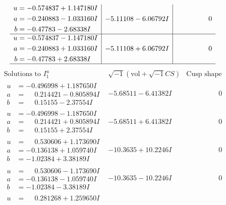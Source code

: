 \documentclass[1p]{elsarticle_modified}
\theoremstyle{definition}
\newcommand{\I}{\sqrt{-1}}
\begin{document}
$$\begin{array}{c|c|c}
\begin{aligned}
u &= -0.574837 + 1.147180 I \\
a &= -0.240883 - 1.033160 I \\
b &= -0.47783 - 2.68338 I\end{aligned}
 & -5.11108 - 6.06792 I & \phantom{-0.000000 } 0 \\ \hline\begin{aligned}
u &= -0.574837 - 1.147180 I \\
a &= -0.240883 + 1.033160 I \\
b &= -0.47783 + 2.68338 I\end{aligned}
 & -5.11108 + 6.06792 I & \phantom{-0.000000 } 0\\
 \hline 
 \end{array}$$\newpage$$\begin{array}{c|c|c}  
\text{Solutions to }I^u_{1}& \I (\text{vol} + \sqrt{-1}CS) & \text{Cusp shape}\\
 \hline 
\begin{aligned}
u &= -0.496998 + 1.187650 I \\
a &= \phantom{-}0.214421 - 0.805894 I \\
b &= \phantom{-}0.15155 - 2.37554 I\end{aligned}
 & -5.68511 - 6.41382 I & \phantom{-0.000000 } 0 \\ \hline\begin{aligned}
u &= -0.496998 - 1.187650 I \\
a &= \phantom{-}0.214421 + 0.805894 I \\
b &= \phantom{-}0.15155 + 2.37554 I\end{aligned}
 & -5.68511 + 6.41382 I & \phantom{-0.000000 } 0 \\ \hline\begin{aligned}
u &= \phantom{-}0.530606 + 1.173690 I \\
a &= -0.136138 + 1.059740 I \\
b &= -1.02384 + 3.38189 I\end{aligned}
 & -10.3635 + 10.2246 I & \phantom{-0.000000 } 0 \\ \hline\begin{aligned}
u &= \phantom{-}0.530606 - 1.173690 I \\
a &= -0.136138 - 1.059740 I \\
b &= -1.02384 - 3.38189 I\end{aligned}
 & -10.3635 - 10.2246 I & \phantom{-0.000000 } 0 \\ \hline\begin{aligned}
u &= \phantom{-}0.281268 + 1.259650 I \\

\end{aligned}
\end{array}$$
\end{document}
